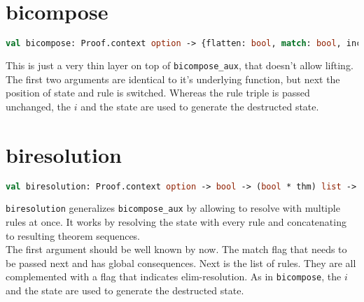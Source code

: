 \section{bicompose}

\begin{lstlisting}[language=ML,breaklines=true]
val bicompose: Proof.context option -> {flatten: bool, match: bool, incremented: bool} -> bool * thm * int -> int -> thm -> thm Seq.seq
\end{lstlisting}

This is just a very thin layer on top of \texttt{bicompose\_aux}, that doesn't allow lifting. The first two arguments are identical to it's underlying function, but next the position of state and rule is switched. Whereas the rule triple is passed unchanged, the $i$ and the state are used to generate the destructed state.\\

\section{biresolution}

\begin{lstlisting}[language=ML,breaklines=true]
val biresolution: Proof.context option -> bool -> (bool * thm) list -> int -> thm -> thm Seq.seq
\end{lstlisting}

\texttt{biresolution} generalizes \texttt{bicompose\_aux} by allowing to resolve with multiple rules at once. It works by resolving the state with every rule and concatenating to resulting theorem sequences.\\
The first argument should be well known by now. The match flag that needs to be passed next and has global consequences. Next is the list of rules. They are all complemented with a flag that indicates elim-resolution. As in \texttt{bicompose}, the $i$ and the state are used to generate the destructed state.